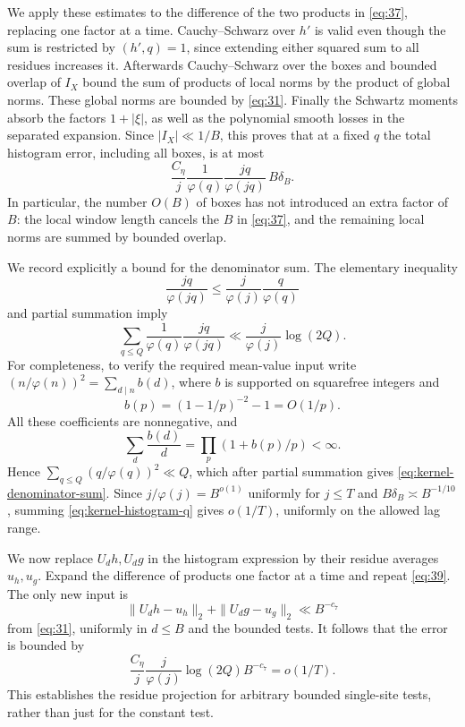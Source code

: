 We apply these estimates to the difference of the two products in
\eqref{eq:37}, replacing one factor at a time.  Cauchy--Schwarz over
\(h'\) is valid even though the sum is restricted by \((h',q)=1\),
since extending either squared sum to all residues increases it.
Afterwards Cauchy--Schwarz over the boxes and bounded overlap of
\(I_X\) bound the sum of products of local norms by the product of
global norms.  These global norms are bounded by \eqref{eq:31}.
Finally the Schwartz moments absorb the factors \(1+|\xi|\), as
well as the polynomial smooth losses in the separated expansion.
Since \(|I_X|\ll1/B\), this proves that at a fixed \(q\) the total
histogram error, including all boxes, is at most
\begin{equation}\label{eq:kernel-histogram-q}
 \frac{C_\eta}{j}
    \frac1{\varphi(q)}\frac{jq}{\varphi(jq)}\,B\delta_B.
\end{equation}
In particular, the number \(O(B)\) of boxes has not introduced an
extra factor of \(B\): the local window length cancels the \(B\) in
\eqref{eq:37}, and the remaining local norms are summed by bounded
overlap.

We record explicitly a bound for the denominator sum.  The elementary
inequality
\[
 \frac{jq}{\varphi(jq)}
 \le\frac j{\varphi(j)}\frac q{\varphi(q)}
\]
and partial summation imply
\begin{equation}\label{eq:kernel-denominator-sum}
 \sum_{q\le Q}\frac1{\varphi(q)}\frac{jq}{\varphi(jq)}
 \ll\frac j{\varphi(j)}\log(2Q).
\end{equation}
For completeness, to verify the required mean-value input write
\((n/\varphi(n))^2=\sum_{d\mid n}b(d)\), where \(b\) is supported
on squarefree integers and
\[
 b(p)=(1-1/p)^{-2}-1=O(1/p).
\]
All these coefficients are nonnegative, and
\[
 \sum_d\frac{b(d)}d=\prod_p(1+b(p)/p)<\infty.
\]
Hence
\(\sum_{q\le Q}(q/\varphi(q))^2\ll Q\), which after partial
summation gives \eqref{eq:kernel-denominator-sum}.  Since
\(j/\varphi(j)=B^{o(1)}\) uniformly for \(j\le T\) and
\(B\delta_B\asymp B^{-1/10}\), summing
\eqref{eq:kernel-histogram-q} gives \(o(1/T)\), uniformly on the
allowed lag range.

We now replace \(U_dh,U_dg\) in the histogram expression by their
residue averages \(u_h,u_g\).  Expand the difference of products
one factor at a time and repeat \eqref{eq:39}.  The only new input
is
\[
 \|U_dh-u_h\|_2+\|U_dg-u_g\|_2\ll B^{-c_7}
\]
from \eqref{eq:31}, uniformly in \(d\le B\) and the bounded tests.
It follows that the error is bounded by
\[
 \frac{C_\eta}{j}\frac j{\varphi(j)}
                  \log(2Q)B^{-c_7}=o(1/T).
\]
This establishes the residue projection for arbitrary bounded
single-site tests, rather than just for the constant test.

